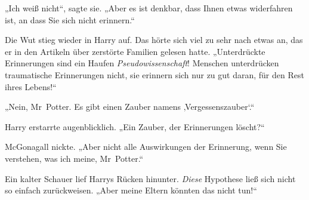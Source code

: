 „Ich weiß nicht“, sagte sie. „Aber es ist denkbar, dass Ihnen etwas widerfahren ist, an dass Sie sich nicht erinnern.“

Die Wut stieg wieder in Harry auf. Das hörte sich viel zu sehr nach etwas an, das er in den Artikeln über zerstörte Familien gelesen hatte. „Unterdrückte Erinnerungen sind ein Haufen \emph{Pseudowissenschaft}! Menschen unterdrücken traumatische Erinnerungen nicht, sie erinnern sich nur zu gut daran, für den Rest ihres Lebens!“

„Nein, Mr~Potter. Es gibt einen Zauber namens ‚Vergessenszauber‘.“

Harry erstarrte augenblicklich. „Ein Zauber, der Erinnerungen löscht?“

McGonagall nickte. „Aber nicht alle Auswirkungen der Erinnerung, wenn Sie verstehen, was ich meine, Mr~Potter.“

Ein kalter Schauer lief Harrys Rücken hinunter. \emph{Diese} Hypothese ließ sich nicht so einfach zurückweisen. „Aber meine Eltern könnten das nicht tun!“

